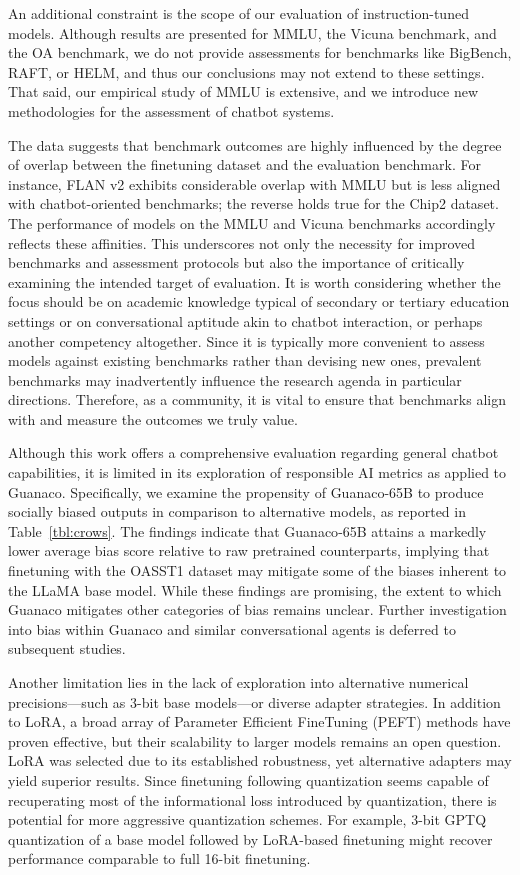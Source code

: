An additional constraint is the scope of our evaluation of instruction-tuned models. Although results are presented for MMLU, the Vicuna benchmark, and the OA benchmark, we do not provide assessments for benchmarks like BigBench, RAFT, or HELM, and thus our conclusions may not extend to these settings. That said, our empirical study of MMLU is extensive, and we introduce new methodologies for the assessment of chatbot systems.

The data suggests that benchmark outcomes are highly influenced by the degree of overlap between the finetuning dataset and the evaluation benchmark. For instance, FLAN v2 exhibits considerable overlap with MMLU but is less aligned with chatbot-oriented benchmarks; the reverse holds true for the Chip2 dataset. The performance of models on the MMLU and Vicuna benchmarks accordingly reflects these affinities. This underscores not only the necessity for improved benchmarks and assessment protocols but also the importance of critically examining the intended target of evaluation. It is worth considering whether the focus should be on academic knowledge typical of secondary or tertiary education settings or on conversational aptitude akin to chatbot interaction, or perhaps another competency altogether. Since it is typically more convenient to assess models against existing benchmarks rather than devising new ones, prevalent benchmarks may inadvertently influence the research agenda in particular directions. Therefore, as a community, it is vital to ensure that benchmarks align with and measure the outcomes we truly value.

Although this work offers a comprehensive evaluation regarding general chatbot capabilities, it is limited in its exploration of responsible AI metrics as applied to {Guanaco}. Specifically, we examine the propensity of {Guanaco}-65B to produce socially biased outputs in comparison to alternative models, as reported in Table~\ref{tbl:crows}. The findings indicate that {Guanaco}-65B attains a markedly lower average bias score relative to raw pretrained counterparts, implying that finetuning with the OASST1 dataset may mitigate some of the biases inherent to the LLaMA base model. While these findings are promising, the extent to which {Guanaco} mitigates other categories of bias remains unclear. Further investigation into bias within {Guanaco} and similar conversational agents is deferred to subsequent studies.

Another limitation lies in the lack of exploration into alternative numerical precisions—such as 3-bit base models—or diverse adapter strategies. In addition to LoRA, a broad array of Parameter Efficient FineTuning (PEFT) methods have proven effective, but their scalability to larger models remains an open question. LoRA was selected due to its established robustness, yet alternative adapters may yield superior results. Since finetuning following quantization seems capable of recuperating most of the informational loss introduced by quantization, there is potential for more aggressive quantization schemes. For example, 3-bit GPTQ quantization of a base model followed by LoRA-based finetuning might recover performance comparable to full 16-bit finetuning.

